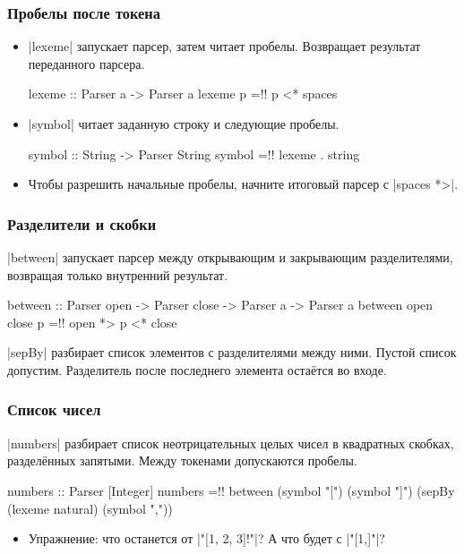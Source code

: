 \documentclass[11pt]{beamer}
\begin{document}
\begin{frame}[fragile]
  \frametitle{Пробелы после токена}
  \begin{itemize}
    \item \haskinline|lexeme| запускает парсер, затем читает пробелы. Возвращает результат переданного парсера.
      \pause
      \begin{haskellsmall}
        lexeme :: Parser a -> Parser a
        lexeme p =!\pause! p <* spaces
      \end{haskellsmall}
      \pause
    \item \haskinline|symbol| читает заданную строку и следующие пробелы.
      \pause
      \begin{haskellsmall}
        symbol :: String -> Parser String
        symbol =!\pause! lexeme . string
      \end{haskellsmall}
    \item Чтобы разрешить начальные пробелы, начните итоговый парсер с \haskinline|spaces *>|.
  \end{itemize}
\end{frame}

\begin{frame}[fragile]
  \frametitle{Разделители и скобки}
  \haskinline|between| запускает парсер между открывающим и закрывающим разделителями, возвращая только внутренний результат.
  \pause
  \begin{haskellsmall}
    between :: Parser open -> Parser close ->
               Parser a -> Parser a
    between open close p =!\pause! open *> p <* close
  \end{haskellsmall}
  \pause
  \haskinline|sepBy| разбирает список элементов с разделителями между ними. Пустой список допустим. Разделитель после последнего элемента остаётся во входе.
  \pause
\end{frame}

\begin{frame}[fragile]
  \frametitle{Список чисел}
  \haskinline|numbers| разбирает список неотрицательных целых чисел в квадратных скобках, разделённых запятыми. Между токенами допускаются пробелы.
  \pause
  \begin{haskellsmall}
    numbers :: Parser [Integer]
    numbers =!\pause! between (symbol "[") (symbol "]")
      (sepBy (lexeme natural) (symbol ","))
  \end{haskellsmall}
  \begin{itemize}
    \item Упражнение: что останется от \haskinline|"[1, 2, 3]!"|? А что будет с \haskinline|"[1,]"|?
  \end{itemize}
\end{frame}
\end{document}
